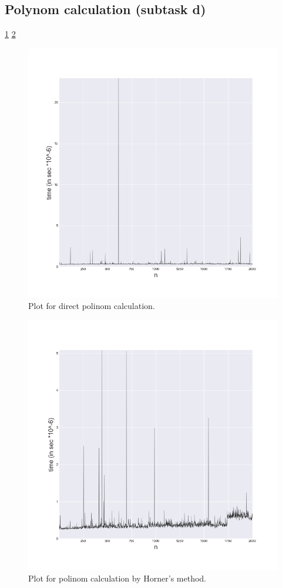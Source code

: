 \documentclass[a4paper,article,14pt]{extarticle}
\begin{document}
	\subsection{Polynom calculation (subtask d)}
	\ref{direct}
	\ref{horners}
	\begin{figure}[h]
		\centering
		\includegraphics[scale=0.5]{calculatePolinom.png}
		\caption{Plot for direct polinom calculation.}
		\label{direct}
	\end{figure} 

	\begin{figure}
		\centering
		\includegraphics[scale=0.5]{horners.png}
		\caption{Plot for polinom calculation by Horner's method.}
		\label{horners}
	\end{figure} 
	
\end{document}
